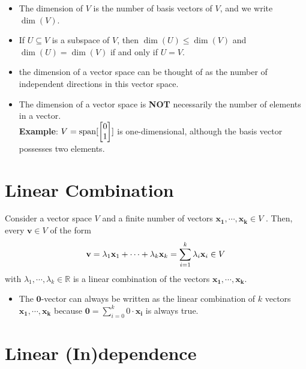 \begin{itemize}
    \item The dimension of $V$ is the number of basis vectors of $V$, and we write $\dim(V)$.

    \item If $U \subseteq V$ is a subspace of $V$, then $\dim(U) \leq \dim(V)$ and $\dim(U) = \dim(V)$ if and only if $U = V$.

    \item the dimension of a vector space can be thought of as the number of independent directions in this vector space.

    \item The dimension of a vector space is \textbf{NOT} necessarily the number of elements in a vector.\\
    \textbf{Example}: $V = \operatorname{span}[\begin{bmatrix}0\\1\end{bmatrix}]$ is one-dimensional, although the basis vector possesses two elements.
    
\end{itemize}









\section{Linear Combination \cite{mfml-1}}\label{Linear Combination}
Consider a vector space $V$ and a finite number of vectors $\mathbf{x_1, \cdots , x_k} \in V$ . Then, every $\mathbf{v} \in V$ of the form
\[
    \hfill
    \displaystyle
    \mathbf{v} = \lambda_1 \mathbf{x}_1 + \cdots + \lambda_k \mathbf{x}_k = \sum_{i=1}^{k} \lambda_i \mathbf{x}_i \in V
    \hfill
\] 
with $\lambda_1, \cdots, \lambda_k \in \mathbb{R}$ is a linear combination of the vectors $\mathbf{x_1, \cdots, x_k}$.

\begin{itemize}
    \item The $\mathbf{0}$-vector can always be written as the linear combination of $k$ vectors $\mathbf{x_1, \cdots, x_k}$ because $\displaystyle\mathbf{0} = \sum_{i=0}^{k} 0\cdot\mathbf{x_i}$ is always true.
\end{itemize}






\section{Linear (In)dependence \cite{mfml-1}}\label{Linear (In)dependence}

